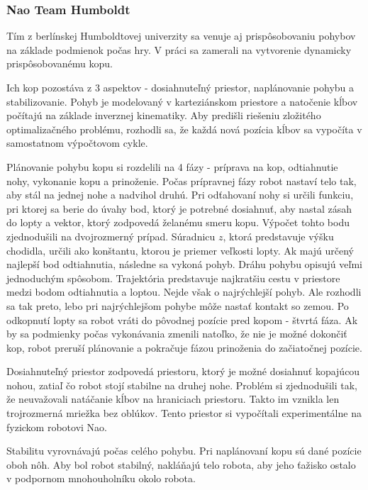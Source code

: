 \subsubsection{Nao Team Humboldt} \label{humboldt}
Tím z berlínskej Humboldtovej univerzity sa venuje aj prispôsobovaniu pohybov na základe podmienok počas hry. V práci \cite{humboldt} sa zamerali na vytvorenie dynamicky prispôsobovanému kopu.

Ich kop pozostáva z 3 aspektov - dosiahnuteľný priestor, naplánovanie pohybu a stabilizovanie. Pohyb je modelovaný v karteziánskom priestore a natočenie kĺbov počítajú na základe inverznej kinematiky. Aby predišli riešeniu zložitého optimalizačného problému, rozhodli sa, že každá nová pozícia kĺbov sa vypočíta v samostatnom výpočtovom cykle.

Plánovanie pohybu kopu si rozdelili na 4 fázy - príprava na kop, odtiahnutie nohy, vykonanie kopu a prinoženie. Počas prípravnej fázy robot nastaví telo tak, aby stál na jednej nohe a nadvihol druhú. Pri odťahovaní nohy si určili funkciu, pri ktorej sa berie do úvahy bod, ktorý je potrebné dosiahnuť, aby nastal zásah do lopty a vektor, ktorý zodpovedá želanému smeru kopu. Výpočet tohto bodu zjednodušili na dvojrozmerný prípad. Súradnicu $z$, ktorá predstavuje výšku chodidla, určili ako konštantu, ktorou je priemer veľkosti lopty. Ak majú určený najlepší bod odtiahnutia, následne sa vykoná pohyb. Dráhu pohybu opisujú veľmi jednoduchým spôsobom. Trajektória predstavuje najkratšiu cestu v priestore medzi bodom odtiahnutia a loptou. Nejde však o najrýchlejší pohyb. Ale rozhodli sa tak preto, lebo pri najrýchlejšom pohybe môže nastať kontakt so zemou. Po odkopnutí lopty sa robot vráti do pôvodnej pozície pred kopom - štvrtá fáza. Ak by sa podmienky počas vykonávania zmenili natoľko, že nie je možné dokončiť kop, robot preruší plánovanie a pokračuje fázou prinoženia do začiatočnej pozície.

Dosiahnuteľný priestor zodpovedá priestoru, ktorý je možné dosiahnuť kopajúcou nohou, zatiaľ čo robot stojí stabilne na druhej nohe. Problém si zjednodušili tak, že neuvažovali natáčanie kĺbov na hraniciach priestoru. Takto im vznikla len trojrozmerná mriežka bez oblúkov. Tento priestor si vypočítali experimentálne na fyzickom robotovi Nao.

Stabilitu vyrovnávajú počas celého pohybu. Pri naplánovaní kopu sú dané pozície oboh nôh. Aby bol robot stabilný, nakláňajú telo robota, aby jeho ťažisko ostalo v podpornom mnohouholníku okolo robota.